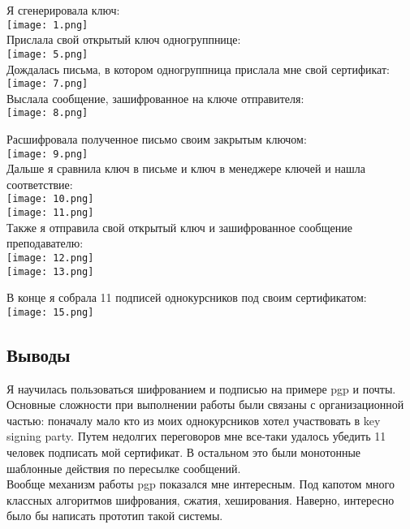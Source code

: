 \documentclass[12pt]{article}
\begin{document}
Я сгенерировала ключ:\\
\texttt{[image: 1.png]}\\

Прислала свой открытый ключ одногруппнице:\\
\texttt{[image: 5.png]}\\

Дождалась письма, в котором одногруппница прислала мне свой сертификат:\\
\texttt{[image: 7.png]}\\

Выслала сообщение, зашифрованное на ключе отправителя:\\
\texttt{[image: 8.png]}\\
\newpage

Расшифровала полученное письмо своим закрытым ключом:\\
\texttt{[image: 9.png]}\\

Дальше я сравнила ключ в письме и ключ в менеджере ключей и нашла соответствие:\\
\texttt{[image: 10.png]}\\
\texttt{[image: 11.png]}\\

Также я отправила свой открытый ключ и зашифрованное сообщение преподавателю:\\
\texttt{[image: 12.png]}\\
\texttt{[image: 13.png]}\\
\newpage

В конце я собрала 11 подписей однокурсников под своим сертификатом:\\
\texttt{[image: 15.png]}\\

\subsection*{Выводы}
Я научилась пользоваться шифрованием и подписью на примере pgp и почты. Основные сложности при выполнении работы были связаны с организационной частью: поначалу мало кто из моих однокурсников хотел участвовать в key signing party. Путем недолгих переговоров мне все-таки удалось убедить 11 человек подписать мой сертификат. В остальном это были монотонные шаблонные действия по пересылке сообщений.\\

Вообще механизм работы pgp показался мне интересным. Под капотом много классных алгоритмов шифрования, сжатия, хеширования. Наверно, интересно было бы написать прототип такой системы.
\end{document}
